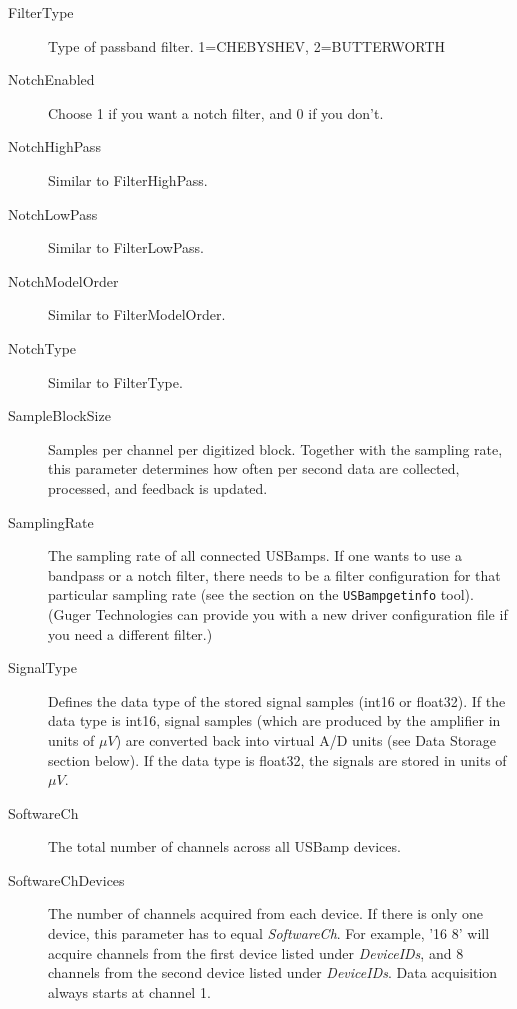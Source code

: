 \documentclass[letterpaper, oneside, 12pt]{article}
\begin{document}
\begin{description}
 \item [FilterType]     Type of passband filter. 1=CHEBYSHEV, 2=BUTTERWORTH
 \item [NotchEnabled]   Choose 1 if you want a notch filter,
                        and 0 if you don't.
 \item [NotchHighPass]     Similar to FilterHighPass.
 \item [NotchLowPass]      Similar to FilterLowPass.
 \item [NotchModelOrder]   Similar to FilterModelOrder.
 \item [NotchType]         Similar to FilterType.
 \item [SampleBlockSize]   Samples per channel per digitized block. Together with the sampling rate,
                           this parameter determines how often per second data are collected, processed,
                           and feedback is updated.
 \item [SamplingRate]      The sampling rate of all connected USBamps. If one wants to 
                           use a bandpass or a notch filter, there needs to be a filter
                           configuration for that particular sampling rate (see the section
                           on the \texttt{USBampgetinfo} tool). (Guger Technologies can
                           provide you with a new driver configuration file if you need
                           a different filter.)
 \item [SignalType]        Defines the data type of the stored signal samples (int16 or float32).
                           If the data type is int16, signal samples (which are produced by
                           the amplifier in units of $\mu V$) are converted back into virtual A/D units
                           (see Data Storage section below). If the data type is float32, the signals
                           are stored in units of $\mu V$.
 \item [SoftwareCh]        The total number of channels across all USBamp devices.
 \item [SoftwareChDevices] The number of channels acquired from each device. 
                           If there is only one device, this parameter has to equal \textit{SoftwareCh}.
                           For example, '16 8' will acquire channels from the 
                           first device listed under \textit{DeviceIDs}, and 8 channels
                           from the second device listed under \textit{DeviceIDs}.
                           Data acquisition always starts at channel 1.

\end{description}
\end{document}
